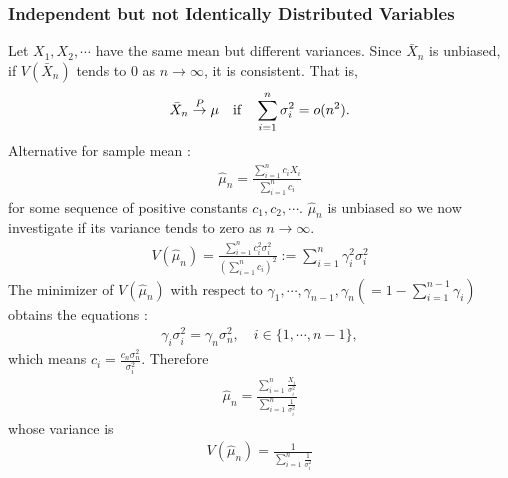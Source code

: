 \documentclass[12pt]{article}
\renewcommand{\=}[1]{\stackrel{#1}{=}} %
\theoremstyle{definition}
\begin{document}
\subsubsection{Independent but not Identically Distributed Variables}
Let $X_1,X_2,\cdots$ have the same mean but different variances. Since $\bar{X}_n$ is unbiased, if $V(\bar{X}_n)$ tends to $0$ as $n\overset{}{\rightarrow}\infty$, it is consistent. That is,
\begin{align}
\bar{X}_n\overset{P}{\rightarrow}\mu\text{\quad if\quad}\sum_{i=1}^{n}\sigma_i^2=o(n^2).
\end{align}
Alternative for sample mean :
\begin{align}
\hat{\mu}_n=\frac{\sum_{i=1}^nc_iX_i}{\sum_{i=1}^nc_i}
\end{align}
for some sequence of positive constants $c_1,c_2,\cdots$. $\hat{\mu}_n$ is unbiased so we now investigate if its variance tends to zero as $n\overset{}{\rightarrow}\infty$.
\begin{align}
V(\hat{\mu}_n)=\frac{\sum_{i=1}^nc_i^2\sigma_i^2}{(\sum_{i=1}^nc_i)^2}:=\sum_{i=1}^n\gamma_i^2\sigma_i^2
\end{align}
The minimizer of $V(\hat{\mu}_n)$ with respect to $\gamma_1,\cdots,\gamma_{n-1},\gamma_n(=1-\sum_{i=1}^{n-1}\gamma_i)$ obtains the equations :
\begin{align}
\gamma_i\sigma_i^2=\gamma_n\sigma_n^2,\quad i\in\{1,\cdots,n-1\},
\end{align}
which means $c_i=\frac{c_n\sigma_n^2}{\sigma_i^2}$. Therefore 
\begin{align}
\hat{\mu}_n=\frac{\sum_{i=1}^n\frac{X_i}{\sigma_i^2}}{\sum_{i=1}^n\frac{1}{\sigma_i^2}}
\end{align}
whose variance is
\begin{align}
V(\hat{\mu}_n)=\frac{1}{\sum_{i=1}^n\frac{1}{\sigma_i^2}}
\end{align}
\end{document}
